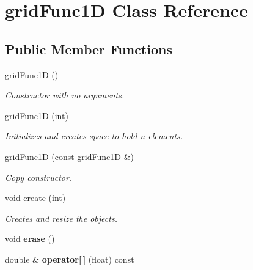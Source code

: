 \hypertarget{classgridFunc1D}{}\section{grid\+Func1D Class Reference}
\label{classgridFunc1D}
\subsection*{Public Member Functions}
\begin{DoxyCompactItemize}
\item 
\hyperlink{classgridFunc1D_a014ccb9f69e514547d24998fd3f5523b}{grid\+Func1D} ()
\begin{DoxyCompactList}\small\item\em Constructor with no arguments. \end{DoxyCompactList}\item 
\mbox{\label{classgridFunc1D_a3f83c015b602a1d4ea0a0b9bf00812bd}} 
\hyperlink{classgridFunc1D_a3f83c015b602a1d4ea0a0b9bf00812bd}{grid\+Func1D} (int)
\begin{DoxyCompactList}\small\item\em Initializes and creates space to hold n elements. \end{DoxyCompactList}\item 
\mbox{\label{classgridFunc1D_a3e5e1b42909e666b2d996a2c7b20124d}} 
\hyperlink{classgridFunc1D_a3e5e1b42909e666b2d996a2c7b20124d}{grid\+Func1D} (const \hyperlink{classgridFunc1D}{grid\+Func1D} \&)
\begin{DoxyCompactList}\small\item\em Copy constructor. \end{DoxyCompactList}\item 
void \hyperlink{classgridFunc1D_a0d33423ea192c516bfaf9c0cc77cd943}{create} (int)
\begin{DoxyCompactList}\small\item\em Creates and resize the objects. \end{DoxyCompactList}\item 
\mbox{\label{classgridFunc1D_a4df1b6d0de38c1d13e2cfc473d77cb5d}} 
void {\bfseries erase} ()
\item 
\mbox{\label{classgridFunc1D_a4bea39799321d46142b978a8a17d800e}} 
double \& {\bfseries operator\mbox{[}$\,$\mbox{]}} (float) const

\end{DoxyCompactItemize}
